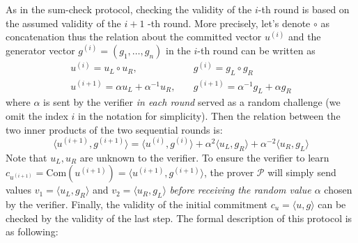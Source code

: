 \documentclass{article}
\begin{document}
As in the sum-check protocol, checking the validity of the $i$-th round is based on the assumed validity of the $i + 1$ -th round. More precisely, let's denote $\circ$ as concatenation thus the relation about the committed vector $u^{(i)}$ and the generator vector $g^{(i)} = (g_1, \dots, g_n)$ in the $i$-th round can be written as
\begin{equation*}
\begin{split}
u^{(i)} = u_L \circ u_R , & \quad g^{(i)}  = g_L \circ g_R\\
u^{(i+1)} = \alpha u_L + \alpha^{-1} u_R , & \quad g^{(i+1)}  = \alpha^{-1} g_L + \alpha g_R
\end{split}
\end{equation*} 
where $\alpha$ is sent by the verifier \textit{in each round} served as a random challenge (we omit the index $i$ in the notation for simplicity). Then the relation between the two inner products of the two sequential rounds is:
\begin{equation*}
\langle u^{(i+1)}, g^{(i+1)} \rangle = \langle u^{(i)}, g^{(i)} \rangle + \alpha^2 \langle u_{L}, g_R \rangle + \alpha^{-2} \langle u_R, g_{L} \rangle
\end{equation*}
Note that $u_L, u_R$ are unknown to the verifier. To ensure the verifier to learn $c_{u^{(i+1)}} = \text{Com}(u^{(i+1)}) = \langle u^{(i+1)}, g^{(i+1)} \rangle$, the prover $\mathcal{P}$ will simply send values $v_1 = \langle u_{L}, g_R \rangle$ and $v_{2} = \langle u_{R}, g_L \rangle$ \textit{before receiving the random value $\alpha$} chosen by the verifier. Finally, the validity of the initial commitment  $c_u = \langle u, g \rangle$ can be checked by the validity of the last step. The formal description of this protocol is as following:
\end{document}
